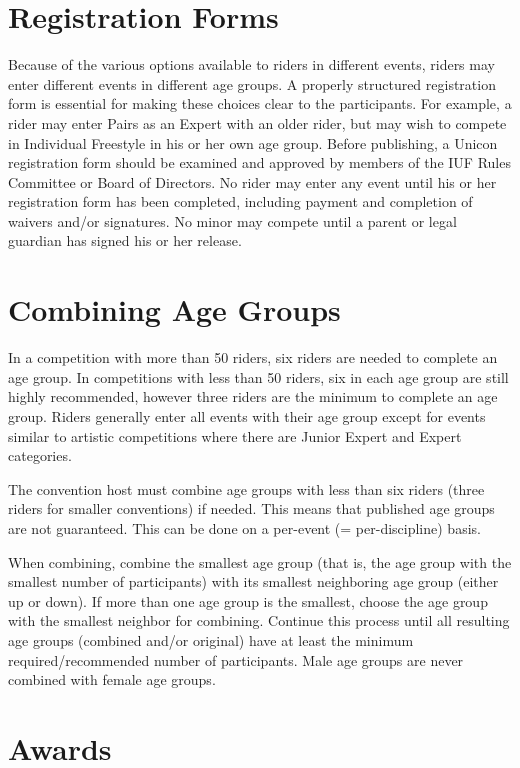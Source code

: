\section{Registration Forms}
Because of the various options available to riders in different events, riders may enter different events in different age groups.
A properly structured registration form is essential for making these choices clear to the participants.
For example, a rider may enter Pairs as an Expert with an older rider, but may wish to compete in Individual Freestyle in his or her own age group.
Before publishing, a Unicon registration form should be examined and approved by members of the IUF Rules Committee or Board of Directors.
No rider may enter any event until his or her registration form has been completed, including payment and completion of waivers and/or signatures.
No minor may compete until a parent or legal guardian has signed his or her release.

\section{Combining Age Groups \label{subsec:general_host's-option-unicon_combining-age-groups}}

In a competition with more than 50 riders, six riders are needed to complete an age group.
In competitions with less than 50 riders, six in each age group are still highly recommended, however three riders are the minimum to complete an age group.
Riders generally enter all events with their age group except for events similar to artistic competitions where there are Junior Expert and Expert categories.

The convention host must combine age groups with less than six riders (three riders for smaller conventions) if needed.
This means that published age groups are not guaranteed.
This can be done on a per-event (= per-discipline) basis.

When combining, combine the smallest age group (that is, the age group with the smallest number of participants) with its smallest neighboring age group (either up or down).
If more than one age group is the smallest, choose the age group with the smallest neighbor for combining.
Continue this process until all resulting age groups (combined and/or original) have at least the minimum required/recommended number of participants.
Male age groups are never combined with female age groups.

\section{Awards}

